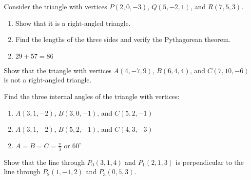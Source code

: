 \begin{multicols}{2}
\begin{ex}
Consider the triangle with vertices $P(2, 0, -3)$, $Q(5, -2, 1)$, and $R(7, 5, 3)$.


\begin{enumerate}[label={\alph*.}]
\item Show that it is a right-angled triangle.

\item Find the lengths of the three sides and verify the Pythagorean theorem.

\end{enumerate}
\begin{sol}
\begin{enumerate}[label={\alph*.}]
\setcounter{enumi}{1}
\item  $29 + 57 = 86$

\end{enumerate}
\end{sol}
\end{ex}

\begin{ex}
Show that the triangle with vertices $A(4, -7, 9)$, $B(6, 4, 4)$, and $C(7, 10, -6)$ is not a right-angled triangle.
\end{ex}

\begin{ex}
Find the three internal angles of the triangle with vertices:


\begin{enumerate}[label={\alph*.}]
\item $A(3, 1, -2)$, $B(3, 0, -1)$, and $C(5, 2, -1)$

\item $A(3, 1, -2)$, $B(5, 2, -1)$, and $C(4, 3, -3)$

\end{enumerate}
\begin{sol}
\begin{enumerate}[label={\alph*.}]
\setcounter{enumi}{1}
\item $A = B = C = \frac{\pi}{3}$ or $60^\circ$ 

\end{enumerate}
\end{sol}
\end{ex}

\begin{ex}
Show that the line through $P_{0}(3, 1, 4)$ and $P_{1}(2, 1, 3)$ is perpendicular to the line through $P_{2}(1, -1, 2)$ and $P_{3}(0, 5, 3)$.
\end{ex}


\end{multicols}
